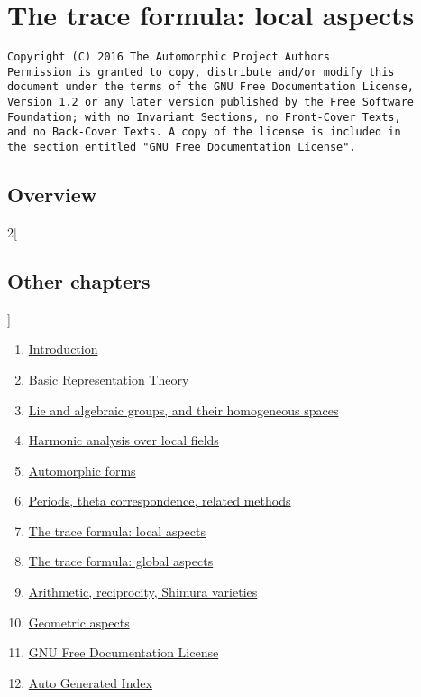 \documentclass{stacks-project-book}
\theoremstyle{plain}
\theoremstyle{definition}
\theoremstyle{remark}
\numberwithin{equation}{subsection}
\begin{document}
%

\chapter{The trace formula: local aspects}



\label{traceformulalocal-section-phantom}

\begin{verbatim}
Copyright (C) 2016 The Automorphic Project Authors
Permission is granted to copy, distribute and/or modify this
document under the terms of the GNU Free Documentation License,
Version 1.2 or any later version published by the Free Software
Foundation; with no Invariant Sections, no Front-Cover Texts,
and no Back-Cover Texts. A copy of the license is included in
the section entitled "GNU Free Documentation License".
\end{verbatim}



\section{Overview}
\label{traceformulalocal-section-overview}

\noindent





\begin{multicols}{2}[\section{Other chapters}]
\noindent
\begin{enumerate}
\item \hyperref[introduction-section-phantom]{Introduction}
\item \hyperref[representationtheory-section-phantom]{Basic Representation Theory}
\item \hyperref[algebraicgroups-section-phantom]{Lie and algebraic groups, and their homogeneous spaces}
\item \hyperref[harmonicanalysis-section-phantom]{Harmonic analysis over local fields}
\item \hyperref[automorphicforms-section-phantom]{Automorphic forms}
\item \hyperref[periods-section-phantom]{Periods, theta correspondence, related methods}
\item \hyperref[traceformulalocal-section-phantom]{The trace formula: local aspects}
\item \hyperref[traceformulaglobal-section-phantom]{The trace formula: global aspects}
\item \hyperref[arithmetic-section-phantom]{Arithmetic, reciprocity, Shimura varieties}
\item \hyperref[geometric-section-phantom]{Geometric aspects}
\item \hyperref[fdl-section-phantom]{GNU Free Documentation License}
\item \hyperref[index-section-phantom]{Auto Generated Index}
\end{enumerate}
\end{multicols}
\end{document}
